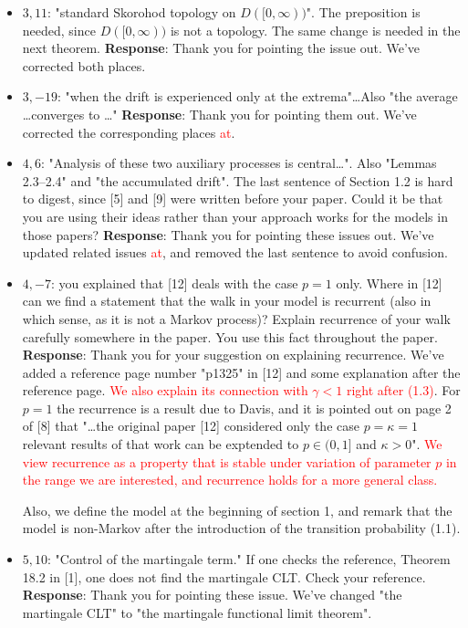 \documentclass[11pt,a4paper]{article}
\numberwithin{equation}{section}
\def\TBF#1{\textcolor{red}{#1}} %
\begin{document}
\begin{itemize}
		
		\item 
		$3,11$: "standard Skorohod topology on $D([0,\infty))$". The preposition is needed, since $D([0,\infty))$ is not a topology. The same change is needed in the next theorem.
		\subitem \textbf{Response}: Thank you for pointing the issue out. We've corrected both places.
		
		\item 
		$3,-19$: "when the drift is experienced only at the extrema"\dots Also "the average \dots converges to \dots"
		\subitem \textbf{Response}: Thank you for pointing them out. We've corrected the  corresponding places \TBF{at}.
		
		\item 
		$4,6$: "Analysis of these two auxiliary processes is central\dots". Also "Lemmas 2.3--2.4" and "the accumulated drift". The last sentence of Section 1.2 is hard to digest, since [5] and [9] were written before your paper. Could it be that you are using their ideas rather than your approach works for the models in those papers?
		\subitem \textbf{Response}: Thank you for pointing these issues out. We've updated related issues \TBF{at}, and removed the last sentence to avoid confusion.
		
		
		\item 
		$4,-7$: you explained that [12] deals with the case $p = 1$ only. Where in [12] can we find a statement	that the walk in your model is recurrent (also in which sense, as it is not a Markov process)? Explain recurrence of your walk carefully somewhere in the paper. You use this fact throughout the paper.
		\subitem \textbf{Response}:
		Thank you for your suggestion on explaining recurrence. We've added a reference page number "p1325" in [12] and some explanation after the reference page. \TBF{We also explain its connection with $\gamma<1$ right after (1.3)}. For $p=1$ the recurrence is a result due to Davis, and it is pointed out on page 2 of [8] that "\dots the original paper [12] considered only the case $p=\kappa= 1$ relevant results of that work can be exptended to $p\in (0,1]$ and $\kappa>0$". \TBF{We view recurrence as a property that is stable under variation of parameter $p$ in the range we are interested, and recurrence holds for a more general class.}
		
		Also, we define the model at the beginning of section 1, and remark that the model is non-Markov after the introduction of the transition probability (1.1). 
		
		
		\item 
		$5,10$: "Control of the martingale term." If one checks the reference, Theorem 18.2 in [1], one does not find the martingale CLT. Check your reference.
		\subitem \textbf{Response}:
		Thank you for pointing these issue. We've changed "the martingale CLT" to "the martingale functional limit theorem".
		

\end{itemize}
\end{document}
